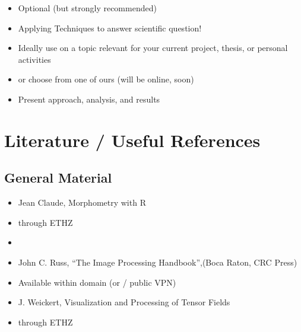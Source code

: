 \documentclass[letterpaper,10pt,english]{sphinxmanual}
\begin{document}
\begin{itemize}
\item {} 
\sphinxAtStartPar
Optional (but strongly recommended)

\item {} 
\sphinxAtStartPar
Applying Techniques to answer scientific question!

\item {} 
\sphinxAtStartPar
Ideally use on a topic relevant for your current project, thesis, or personal activities

\item {} 
\sphinxAtStartPar
or choose from one of ours (will be online, soon)

\item {} 
\sphinxAtStartPar
Present approach, analysis, and results



\end{itemize}




\chapter{Literature / Useful References}
\label{\detokenize{01-Introduction:literature-useful-references}}

\section{General Material}
\label{\detokenize{01-Introduction:general-material}}\begin{itemize}
\item {} 
\sphinxAtStartPar
Jean Claude, Morphometry with R

\item {} 
\sphinxAtStartPar
{} through ETHZ

\item {} 
\sphinxAtStartPar
{}

\item {} 
\sphinxAtStartPar
John C. Russ, “The Image Processing Handbook”,(Boca Raton, CRC Press)

\item {} 
\sphinxAtStartPar
Available  within domain  (or  / public VPN)

\item {} 
\sphinxAtStartPar
J. Weickert, Visualization and Processing of Tensor Fields

\item {} 
\sphinxAtStartPar
{} through ETHZ

\end{itemize}
\end{document}

